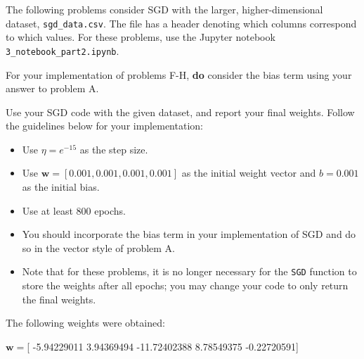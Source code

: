 The following problems consider SGD with the larger, higher-dimensional dataset, \texttt{sgd_data.csv}. The file has a header denoting which columns correspond to which values. For these problems, use the Jupyter notebook \texttt{3_notebook_part2.ipynb}.

For your implementation of problems F-H, \textbf{do} consider the bias term using your answer to problem A.

\begin{problem}[6]
  Use your SGD code with the given dataset, and report your final weights. Follow the guidelines below for your implementation:

  \begin{itemize}
    \item Use $\eta = e^{-15}$ as the step size.  
    \item Use $\mathbf{w} = [0.001, 0.001, 0.001, 0.001]$ as the initial weight vector and $b = 0.001$ as the initial bias.
    \item Use at least 800 epochs.
    \item You should incorporate the bias term in your implementation of SGD and do so in the vector style of problem A.
    \item Note that for these problems, it is no longer necessary for the \texttt{SGD} function to store the weights after all epochs; you may change your code to only return the final weights.
  \end{itemize}
\end{problem}
\begin{solution}
  The following weights were obtained:
  
  $\mathbf{w}=$[ -5.94229011   3.94369494 -11.72402388   8.78549375  -0.22720591]
\end{solution}

